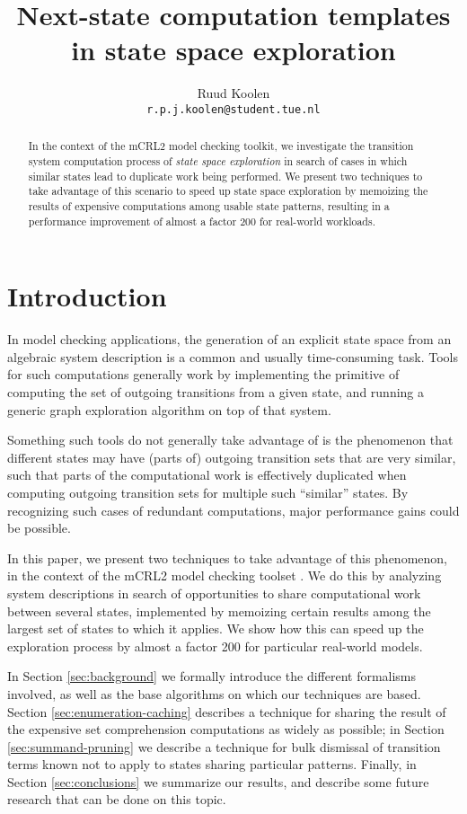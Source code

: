\documentclass[a4paper]{article}
\title{Next-state computation templates in state space exploration}
\author{Ruud Koolen \\ \texttt{r.p.j.koolen@student.tue.nl}}
\begin{document}
\maketitle

\begin{abstract}
\noindent In the context of the mCRL2 model checking toolkit, we investigate the transition system computation process of \textit{state space exploration} in search of cases in which similar states lead to duplicate work being performed. We present two techniques to take advantage of this scenario to speed up state space exploration by memoizing the results of expensive computations among usable state patterns, resulting in a performance improvement of almost a factor 200 for real-world workloads.
\end{abstract}


\section{Introduction}
In model checking applications, the generation of an explicit state space from an algebraic system description is a common and usually time-consuming task. Tools for such computations generally work by implementing the primitive of computing the set of outgoing transitions from a given state, and running a generic graph exploration algorithm on top of that system.

Something such tools do not generally take advantage of is the phenomenon that different states may have (parts of) outgoing transition sets that are very similar, such that parts of the computational work is effectively duplicated when computing outgoing transition sets for multiple such ``similar'' states. By recognizing such cases of redundant computations, major performance gains could be possible.

In this paper, we present two techniques to take advantage of this phenomenon, in the context of the mCRL2 model checking toolset \cite{mcrl2}. We do this by analyzing system descriptions in search of opportunities to share computational work between several states, implemented by memoizing certain results among the largest set of states to which it applies. We show how this can speed up the exploration process by almost a factor 200 for particular real-world models.

In Section \ref{sec:background} we formally introduce the different formalisms involved, as well as the base algorithms on which our techniques are based. Section \ref{sec:enumeration-caching} describes a technique for sharing the result of the expensive set comprehension computations as widely as possible; in Section \ref{sec:summand-pruning} we describe a technique for bulk dismissal of transition terms known not to apply to states sharing particular patterns. Finally, in Section \ref{sec:conclusions} we summarize our results, and describe some future research that can be done on this topic.
\end{document}
